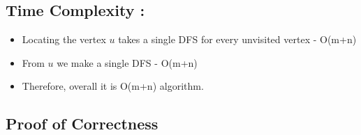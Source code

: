 \documentclass{article}
\begin{document}
\subsection{Time Complexity : }
\begin{itemize}
\item Locating the vertex $u$ takes a single DFS for every unvisited vertex - O(m+n)
\item From $u$ we make a single DFS - O(m+n)
\item Therefore, overall it is O(m+n) algorithm.
\end{itemize}

\subsection{Proof of Correctness}
\end{document}
